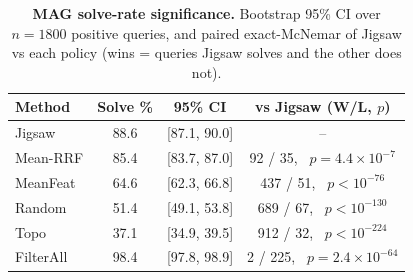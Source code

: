 \documentclass[runningheads]{llncs}
\begin{document}
\begin{table}[H]
\centering
\caption{\textbf{MAG solve-rate significance.} Bootstrap 95\% CI over $n{=}1800$ positive queries, and paired exact-McNemar of Jigsaw vs each policy (wins = queries Jigsaw solves and the other does not).}
\label{tab:significance}
\small
\setlength{\tabcolsep}{6pt}
\begin{tabular}{lccc}
\toprule
\textbf{Method} & \textbf{Solve \%} & \textbf{95\% CI} & \textbf{vs Jigsaw (W/L, $p$)} \\
\midrule
Jigsaw    & 88.6 & [87.1, 90.0] & -- \\
Mean-RRF  & 85.4 & [83.7, 87.0] & 92 / 35, \ $p{=}4.4{\times}10^{-7}$ \\
MeanFeat  & 64.6 & [62.3, 66.8] & 437 / 51, \ $p{<}10^{-76}$ \\
Random    & 51.4 & [49.1, 53.8] & 689 / 67, \ $p{<}10^{-130}$ \\
Topo      & 37.1 & [34.9, 39.5] & 912 / 32, \ $p{<}10^{-224}$ \\
FilterAll & 98.4 & [97.8, 98.9] & 2 / 225, \ $p{=}2.4{\times}10^{-64}$ \\
\bottomrule
\end{tabular}
\end{table}

\begin{table}[H]
\centering
\caption{\textbf{Jigsaw query-family breakdown.} Positive columns report exact-solve rate; negative columns report correct no-match rate. All three datasets use the corrected connected multi-family reruns (the MAG connected refresh is now merged into the canonical grid). All datasets are reported at the matched half-partition budget ($K{=}10/100/1000$); the MAG rows use the deployed walk-aware encoder (overall $88.6\%$).}
\label{tab:jigsaw_family}
\scriptsize
\setlength{\tabcolsep}{3pt}
\end{table}
\end{document}
